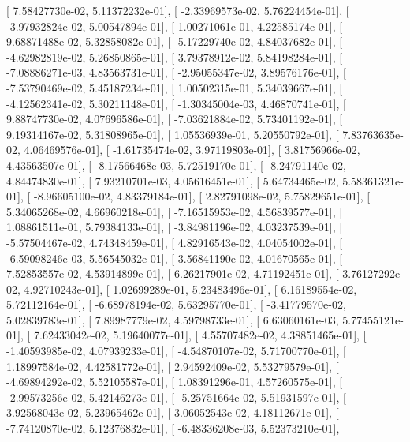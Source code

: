 \documentclass{article}
\begin{document}
       [  7.58427730e-02,   5.11372232e-01],
       [ -2.33969573e-02,   5.76224454e-01],
       [ -3.97932824e-02,   5.00547894e-01],
       [  1.00271061e-01,   4.22585174e-01],
       [  9.68871488e-02,   5.32858082e-01],
       [ -5.17229740e-02,   4.84037682e-01],
       [ -4.62982819e-02,   5.26850865e-01],
       [  3.79378912e-02,   5.84198284e-01],
       [ -7.08886271e-03,   4.83563731e-01],
       [ -2.95055347e-02,   3.89576176e-01],
       [ -7.53790469e-02,   5.45187234e-01],
       [  1.00502315e-01,   5.34039667e-01],
       [ -4.12562341e-02,   5.30211148e-01],
       [ -1.30345004e-03,   4.46870741e-01],
       [  9.88747730e-02,   4.07696586e-01],
       [ -7.03621884e-02,   5.73401192e-01],
       [  9.19314167e-02,   5.31808965e-01],
       [  1.05536939e-01,   5.20550792e-01],
       [  7.83763635e-02,   4.06469576e-01],
       [ -1.61735474e-02,   3.97119803e-01],
       [  3.81756966e-02,   4.43563507e-01],
       [ -8.17566468e-03,   5.72519170e-01],
       [ -8.24791140e-02,   4.84474830e-01],
       [  7.93210701e-03,   4.05616451e-01],
       [  5.64734465e-02,   5.58361321e-01],
       [ -8.96605100e-02,   4.83379184e-01],
       [  2.82791098e-02,   5.75829651e-01],
       [  5.34065268e-02,   4.66960218e-01],
       [ -7.16515953e-02,   4.56839577e-01],
       [  1.08861511e-01,   5.79384133e-01],
       [ -3.84981196e-02,   4.03237539e-01],
       [ -5.57504467e-02,   4.74348459e-01],
       [  4.82916543e-02,   4.04054002e-01],
       [ -6.59098246e-03,   5.56545032e-01],
       [  3.56841190e-02,   4.01670565e-01],
       [  7.52853557e-02,   4.53914899e-01],
       [  6.26217901e-02,   4.71192451e-01],
       [  3.76127292e-02,   4.92710243e-01],
       [  1.02699289e-01,   5.23483496e-01],
       [  6.16189554e-02,   5.72112164e-01],
       [ -6.68978194e-02,   5.63295770e-01],
       [ -3.41779570e-02,   5.02839783e-01],
       [  7.89987779e-02,   4.59798733e-01],
       [  6.63060161e-03,   5.77455121e-01],
       [  7.62433042e-02,   5.19640077e-01],
       [  4.55707482e-02,   4.38851465e-01],
       [ -1.40593985e-02,   4.07939233e-01],
       [ -4.54870107e-02,   5.71700770e-01],
       [  1.18997584e-02,   4.42581772e-01],
       [  2.94592409e-02,   5.53279579e-01],
       [ -4.69894292e-02,   5.52105587e-01],
       [  1.08391296e-01,   4.57260575e-01],
       [ -2.99573256e-02,   5.42146273e-01],
       [ -5.25751664e-02,   5.51931597e-01],
       [  3.92568043e-02,   5.23965462e-01],
       [  3.06052543e-02,   4.18112671e-01],
       [ -7.74120870e-02,   5.12376832e-01],
       [ -6.48336208e-03,   5.52373210e-01],
\end{document}
